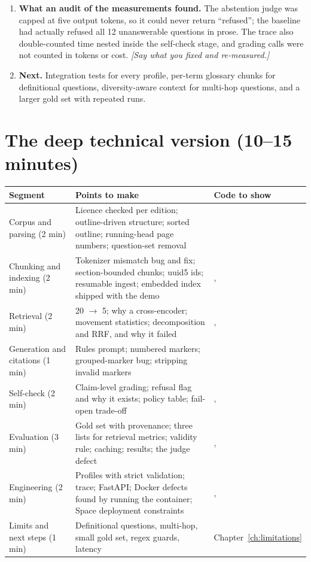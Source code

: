 \begin{enumerate}
  \item \textbf{What an audit of the measurements found.} The abstention judge was capped at five output tokens, so it could never return \enquote{refused}; the baseline had actually refused all 12 unanswerable questions in prose. The trace also double-counted time nested inside the self-check stage, and grading calls were not counted in tokens or cost. \emph{[Say what you fixed and re-measured.]}
  \item \textbf{Next.} Integration tests for every profile, per-term glossary chunks for definitional questions, diversity-aware context for multi-hop questions, and a larger gold set with repeated runs.
\end{enumerate}

\section{The deep technical version (10--15 minutes)}

\begin{center}
\begin{tabularx}{\textwidth}{@{}>{\raggedright\arraybackslash}p{3.3cm}L>{\raggedright\arraybackslash}p{4.2cm}@{}}
\toprule
\textbf{Segment} & \textbf{Points to make} & \textbf{Code to show}\\
\midrule
Corpus and parsing (2 min) & Licence checked per edition; outline-driven structure; sorted outline; running-head page numbers; question-set removal & \\
Chunking and indexing (2 min) & Tokenizer mismatch bug and fix; section-bounded chunks; uuid5 ids; resumable ingest; embedded index shipped with the demo & , \\
Retrieval (2 min) & 20 $\rightarrow$ 5; why a cross-encoder; movement statistics; decomposition and RRF, and why it failed & , \\
Generation and citations (1 min) & Rules prompt; numbered markers; grouped-marker bug; stripping invalid markers & \\
Self-check (2 min) & Claim-level grading; refusal flag and why it exists; policy table; fail-open trade-off & , \\
Evaluation (3 min) & Gold set with provenance; three lists for retrieval metrics; validity rule; caching; results; the judge defect & , \\
Engineering (2 min) & Profiles with strict validation; trace; FastAPI; Docker defects found by running the container; Space deployment constraints & , \\
Limits and next steps (1 min) & Definitional questions, multi-hop, small gold set, regex guards, latency & Chapter~\ref{ch:limitations}\\
\bottomrule
\end{tabularx}
\end{center}

